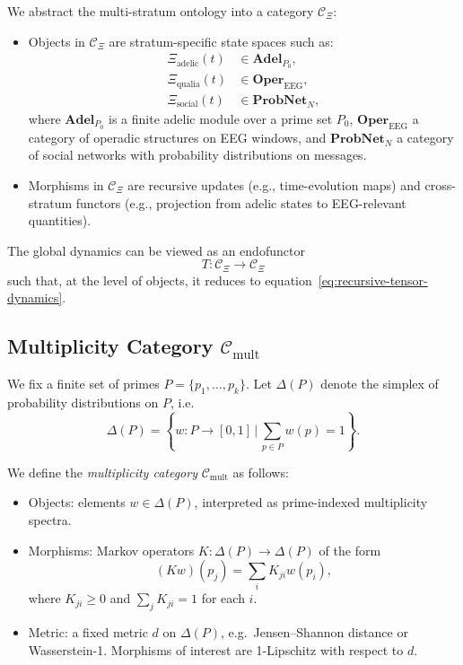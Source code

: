 \documentclass[11pt]{article}
\begin{document}
We abstract the multi-stratum ontology into a category \(\mathcal{C}_\Xi\):

\begin{itemize}
  \item Objects in \(\mathcal{C}_\Xi\) are stratum-specific state spaces such as:
  \begin{align*}
    \Xi_{\text{adelic}}(t) &\in \mathbf{Adel}_{P_0},\\
    \Xi_{\text{qualia}}(t) &\in \mathbf{Oper}_{\text{EEG}},\\
    \Xi_{\text{social}}(t) &\in \mathbf{ProbNet}_N,
  \end{align*}
  where \(\mathbf{Adel}_{P_0}\) is a finite adelic module over a prime set \(P_0\), \(\mathbf{Oper}_{\text{EEG}}\) a category of operadic structures on EEG windows, and \(\mathbf{ProbNet}_N\) a category of social networks with probability distributions on messages.
  \item Morphisms in \(\mathcal{C}_\Xi\) are recursive updates (e.g., time-evolution maps) and cross-stratum functors (e.g., projection from adelic states to EEG-relevant quantities).
\end{itemize}

The global dynamics can be viewed as an endofunctor
\[
  T : \mathcal{C}_\Xi \to \mathcal{C}_\Xi
\]
such that, at the level of objects, it reduces to equation~\eqref{eq:recursive-tensor-dynamics}.

\subsection{Multiplicity Category \(\mathcal{C}_{\mathrm{mult}}\)}

We fix a finite set of primes \(P = \{p_1, \dots, p_k\}\). Let \(\Delta(P)\) denote the simplex of probability distributions on \(P\), i.e.
\[
  \Delta(P) = \left\{ w : P \to [0,1] \,\bigg|\, \sum_{p \in P} w(p) = 1 \right\}.
\]

We define the \emph{multiplicity category} \(\mathcal{C}_{\mathrm{mult}}\) as follows:

\begin{itemize}
  \item Objects: elements \(w \in \Delta(P)\), interpreted as prime-indexed multiplicity spectra.
  \item Morphisms: Markov operators \(K : \Delta(P) \to \Delta(P)\) of the form
  \[
    (Kw)(p_j) = \sum_i K_{ji} w(p_i),
  \]
  where \(K_{ji} \geq 0\) and \(\sum_j K_{ji} = 1\) for each \(i\).
  \item Metric: a fixed metric \(d\) on \(\Delta(P)\), e.g.\ Jensen--Shannon distance or Wasserstein-1. Morphisms of interest are 1-Lipschitz with respect to \(d\).
\end{itemize}
\end{document}
